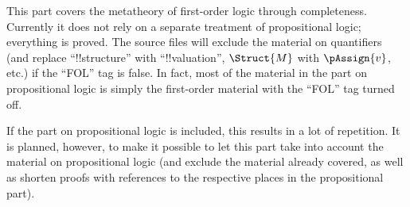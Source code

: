 \documentclass[../../include/open-logic-part]{subfiles}
\begin{document}

\begin{editorial}
  This part covers the metatheory of first-order logic through
  completeness.  Currently it does not rely on a separate treatment of
  propositional logic; everything is proved.  The source files will
  exclude the material on quantifiers (and replace ``!!{structure}''
  with ``!!{valuation}'', $\Struct{M}$ with $\pAssign{v}$, etc.) if
  the ``FOL'' tag is false. In fact, most of the material in the part
  on propositional logic is simply the first-order material with the
  ``FOL'' tag turned off.

  If the part on propositional logic is included, this results in a
  lot of repetition. It is planned, however, to make it possible to
  let this part take into account the material on propositional logic
  (and exclude the material already covered, as well as shorten proofs
  with references to the respective places in the propositional
  part).
\end{editorial}










\OLEndPartHook
\end{document}
